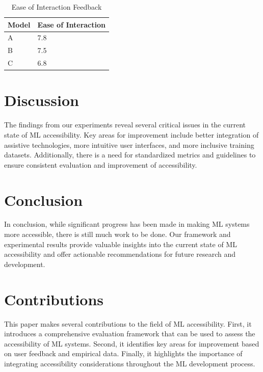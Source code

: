\documentclass{article}
\begin{document}
\begin{table}[ht]
\centering
\caption{Ease of Interaction Feedback}
\label{tab:ease_of_interaction}
\begin{tabular}{@{}ll@{}}
\toprule
Model & Ease of Interaction \\
\midrule
A     & 7.8                \\
B     & 7.5                \\
C     & 6.8                \\

\bottomrule
\end{tabular}
\end{table}

\section{Discussion}
The findings from our experiments reveal several critical issues in the current state of ML accessibility. Key areas for improvement include better integration of assistive technologies, more intuitive user interfaces, and more inclusive training datasets. Additionally, there is a need for standardized metrics and guidelines to ensure consistent evaluation and improvement of accessibility.

\section{Conclusion}
In conclusion, while significant progress has been made in making ML systems more accessible, there is still much work to be done. Our framework and experimental results provide valuable insights into the current state of ML accessibility and offer actionable recommendations for future research and development.

\section{Contributions}
This paper makes several contributions to the field of ML accessibility. First, it introduces a comprehensive evaluation framework that can be used to assess the accessibility of ML systems. Second, it identifies key areas for improvement based on user feedback and empirical data. Finally, it highlights the importance of integrating accessibility considerations throughout the ML development process.
\end{document}
